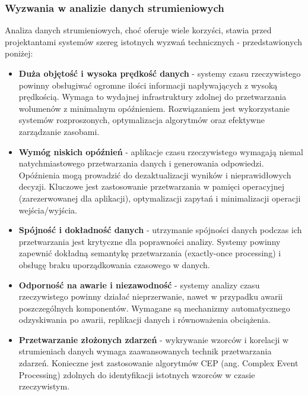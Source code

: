 \subsubsection{Wyzwania w analizie danych strumieniowych}
\label{subsubsec:wyzwania_analizy_rt}

Analiza danych strumieniowych, choć oferuje wiele korzyści, stawia przed projektantami systemów szereg istotnych wyzwań technicznych - przedstawionych poniżej:

\begin{itemize}
    \item \textbf{Duża objętość i wysoka prędkość danych} - systemy czasu rzeczywistego powinny obsługiwać ogromne ilości informacji napływających z wysoką prędkością. Wymaga to wydajnej infrastruktury zdolnej do przetwarzania wolumenów z minimalnym opóźnieniem. Rozwiązaniem jest wykorzystanie systemów rozproszonych, optymalizacja algorytmów oraz efektywne zarządzanie zasobami.
    
    \item \textbf{Wymóg niskich opóźnień} - aplikacje czasu rzeczywistego wymagają niemal natychmiastowego przetwarzania danych i generowania odpowiedzi. Opóźnienia mogą prowadzić do dezaktualizacji wyników i nieprawidłowych decyzji. Kluczowe jest zastosowanie przetwarzania w pamięci operacyjnej (zarezerwowanej dla aplikacji), optymalizacji zapytań i minimalizacji operacji wejścia/wyjścia.
    
    \item \textbf{Spójność i dokładność danych} - utrzymanie spójności danych podczas ich przetwarzania jest krytyczne dla poprawności analizy. Systemy powinny zapewnić dokładną semantykę przetwarzania (exactly-once processing) i obsługę braku uporządkowania czasowego w danych.
    
    \item \textbf{Odporność na awarie i niezawodność} - systemy analizy czasu rzeczywistego powinny działać nieprzerwanie, nawet w przypadku awarii poszczególnych komponentów. Wymagane są mechanizmy automatycznego odzyskiwania po awarii, replikacji danych i równoważenia obciążenia.
    
    \item \textbf{Przetwarzanie złożonych zdarzeń} - wykrywanie wzorców i korelacji w strumieniach danych wymaga zaawansowanych technik przetwarzania zdarzeń. Konieczne jest zastosowanie algorytmów CEP (ang. Complex Event Processing) zdolnych do identyfikacji istotnych wzorców w czasie rzeczywistym.
    

\end{itemize}
